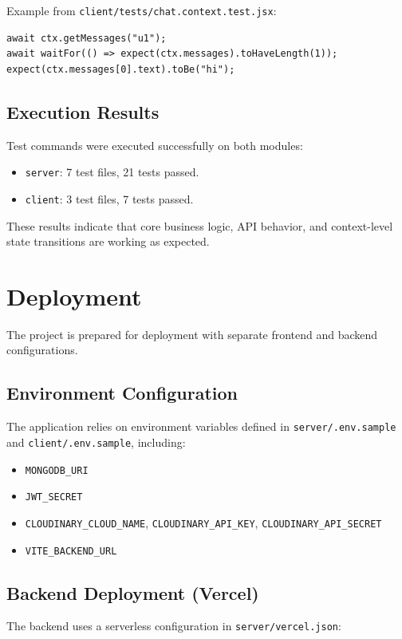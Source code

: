 \documentclass[12pt,a4paper]{report}
\begin{document}
Example from \texttt{client/tests/chat.context.test.jsx}:

\begin{verbatim}
await ctx.getMessages("u1");
await waitFor(() => expect(ctx.messages).toHaveLength(1));
expect(ctx.messages[0].text).toBe("hi");
\end{verbatim}

\subsection{Execution Results}
Test commands were executed successfully on both modules:
\begin{itemize}
    \item \texttt{server}: 7 test files, 21 tests passed.
    \item \texttt{client}: 3 test files, 7 tests passed.
\end{itemize}

These results indicate that core business logic, API behavior, and context-level state transitions are working as expected.

\section{Deployment}
The project is prepared for deployment with separate frontend and backend configurations.

\subsection{Environment Configuration}
The application relies on environment variables defined in \texttt{server/.env.sample} and \texttt{client/.env.sample}, including:
\begin{itemize}
    \item \texttt{MONGODB\_URI}
    \item \texttt{JWT\_SECRET}
    \item \texttt{CLOUDINARY\_CLOUD\_NAME}, \texttt{CLOUDINARY\_API\_KEY}, \texttt{CLOUDINARY\_API\_SECRET}
    \item \texttt{VITE\_BACKEND\_URL}
\end{itemize}

\subsection{Backend Deployment (Vercel)}
The backend uses a serverless configuration in \texttt{server/vercel.json}:
\end{document}
